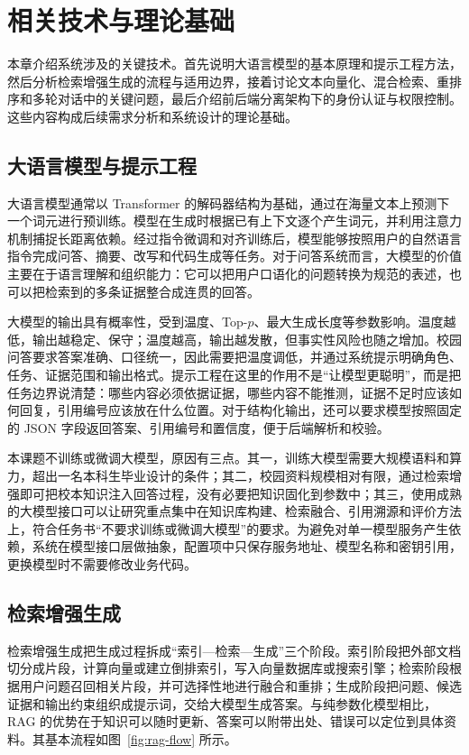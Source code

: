 \chapter{相关技术与理论基础}
\label{chap:technology}

本章介绍系统涉及的关键技术。首先说明大语言模型的基本原理和提示工程方法，然后分析检索增强生成的流程与适用边界，接着讨论文本向量化、混合检索、重排序和多轮对话中的关键问题，最后介绍前后端分离架构下的身份认证与权限控制。这些内容构成后续需求分析和系统设计的理论基础。

\section{大语言模型与提示工程}
\label{sec:llm}

大语言模型通常以 Transformer 的解码器结构为基础，通过在海量文本上预测下一个词元进行预训练。模型在生成时根据已有上下文逐个产生词元，并利用注意力机制捕捉长距离依赖。经过指令微调和对齐训练后，模型能够按照用户的自然语言指令完成问答、摘要、改写和代码生成等任务。对于问答系统而言，大模型的价值主要在于语言理解和组织能力：它可以把用户口语化的问题转换为规范的表述，也可以把检索到的多条证据整合成连贯的回答。

大模型的输出具有概率性，受到温度、Top-$p$、最大生成长度等参数影响。温度越低，输出越稳定、保守；温度越高，输出越发散，但事实性风险也随之增加。校园问答要求答案准确、口径统一，因此需要把温度调低，并通过系统提示明确角色、任务、证据范围和输出格式。提示工程在这里的作用不是“让模型更聪明”，而是把任务边界说清楚：哪些内容必须依据证据，哪些内容不能推测，证据不足时应该如何回复，引用编号应该放在什么位置。对于结构化输出，还可以要求模型按照固定的 JSON 字段返回答案、引用编号和置信度，便于后端解析和校验。

本课题不训练或微调大模型，原因有三点。其一，训练大模型需要大规模语料和算力，超出一名本科生毕业设计的条件；其二，校园资料规模相对有限，通过检索增强即可把校本知识注入回答过程，没有必要把知识固化到参数中；其三，使用成熟的大模型接口可以让研究重点集中在知识库构建、检索融合、引用溯源和评价方法上，符合任务书“不要求训练或微调大模型”的要求。为避免对单一模型服务产生依赖，系统在模型接口层做抽象，配置项中只保存服务地址、模型名称和密钥引用，更换模型时不需要修改业务代码。

\section{检索增强生成}
\label{sec:rag}

检索增强生成把生成过程拆成“索引—检索—生成”三个阶段。索引阶段把外部文档切分成片段，计算向量或建立倒排索引，写入向量数据库或搜索引擎；检索阶段根据用户问题召回相关片段，并可选择性地进行融合和重排；生成阶段把问题、候选证据和输出约束组织成提示词，交给大模型生成答案。与纯参数化模型相比，RAG 的优势在于知识可以随时更新、答案可以附带出处、错误可以定位到具体资料。其基本流程如图~\ref{fig:rag-flow} 所示。

